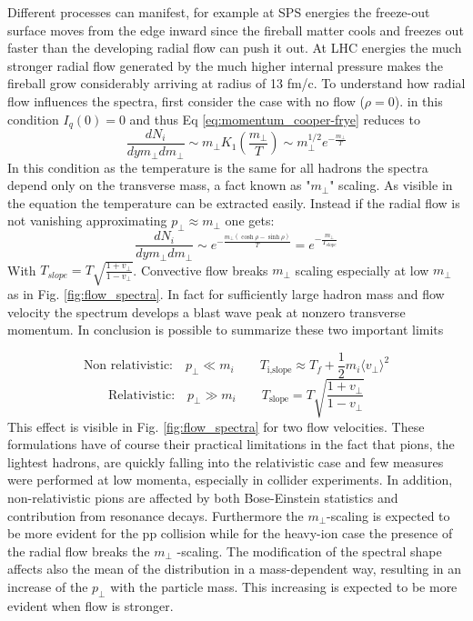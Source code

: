 \documentclass[12pt,a4paper]{book}
\begin{document}
	Different processes can manifest, for example at SPS energies the freeze-out surface moves from the edge inward since the fireball matter cools and freezes out faster than the developing radial flow can push it out. At LHC energies the much stronger radial flow generated by the much higher internal pressure makes the fireball grow considerably arriving at radius of 13 fm/c. 
	To understand how radial flow influences the spectra, first consider the case with no flow ($\rho=0$). in this condition $I_q(0)=0$ and thus Eq \ref{eq:momentum_cooper-frye} reduces to
	\begin{equation}
		\frac{dN_i}{dy m_\perp dm_\perp} \sim m_\perp K_1	\left(\frac{m_\perp}{T}\right) \sim m_\perp^{1/2} e^{- \frac{m_\perp}{T}}
		\label{eq:vanish_rad_flow}
	\end{equation}
	In this condition as the temperature is the same for all hadrons the spectra depend only on the transverse mass, a fact known as "$m_\perp$" scaling. As visible in the equation the temperature can be extracted easily. Instead if the radial flow is not vanishing approximating $p_\perp \approx m_\perp$ one gets:
	\begin{equation}
		\frac{dN_i}{dy m_\perp dm_\perp} \sim  e^{- \frac{m_\perp (\cosh \rho - \sinh \rho)}{T}} =  e^{- \frac{m_\perp}{T_{slope}}}
		\label{eq:no_vanish_rad_flow}
	\end{equation}
	With $T_{slope} = T \sqrt{\frac{1+v_\perp}{1-v_\perp}}$. Convective flow breaks $m_\perp$ scaling especially at low $m_\perp$ as in Fig. \ref{fig:flow_spectra}. In fact for sufficiently large hadron mass and flow velocity the spectrum develops a blast wave peak at nonzero transverse momentum. In conclusion is possible to summarize these two important limits
	
	\begin{equation}
		\text{Non relativistic:}\quad p_\perp \ll m_i \qquad T_{\text{i,slope}} \approx T_f + \frac{1}{2} m_i \langle v_\perp \rangle^2
		\label{eq:T_norel_limit}
	\end{equation}
	\begin{equation}
		\text{Relativistic:}\quad p_\perp \gg m_i \qquad T_{\text{slope}} = T \sqrt{\frac{1+v_\perp}{1-v_\perp}}
		\label{eq:T_rel_limit}
	\end{equation}
	This effect is visible in Fig. \ref{fig:flow_spectra} for two flow velocities. These formulations have of course their practical limitations in the fact that pions, the lightest hadrons, are quickly falling into the relativistic case and few measures were performed at low momenta, especially in collider experiments. In addition, non-relativistic pions are affected by both Bose-Einstein statistics and contribution from resonance decays. Furthermore the $m_\perp$-scaling is expected to be more evident for the pp collision while for the heavy-ion case the presence of the radial flow breaks the $m_\perp$ -scaling. The modification of the spectral shape affects also the mean of the distribution in a mass-dependent way, resulting in an increase of the $p_\perp$ with the particle mass. This increasing is expected to be more evident when flow is stronger.
	
\end{document}
